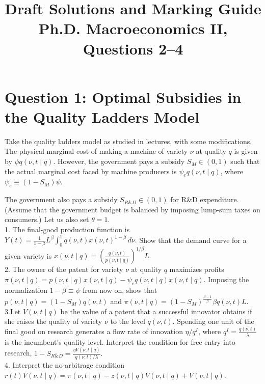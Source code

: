 \documentclass[11pt]{article}
\title{Draft Solutions and Marking Guide\\
Ph.D. Macroeconomics II, Questions 2--4}
\author{}
\date{}
\begin{document}
\maketitle

\section{Question 1: Optimal Subsidies in the Quality Ladders Model}

Take the quality ladders model as studied in lectures, with some modifications. The physical marginal cost of making a machine of variety $\nu$ at quality $q$ is given by $\psi q(\nu,t \mid q)$. However, the government pays a subsidy $S_M \in (0,1)$ such that the actual marginal cost faced by machine producers is $\psi_e q(\nu,t \mid q)$, where $\psi_e \equiv (1-S_M)\psi.$

The government also pays a subsidy $S_{R\&D} \in (0,1)$ for R\&D expenditure. (Assume that the government budget is balanced by imposing lump-sum taxes on consumers.) Let us also set $\theta = 1$.\\

1. The final-good production function is $Y(t)=\frac{1}{1-\beta}L^\beta \int_0^1 q(\nu,t)x(\nu,t)^{1-\beta}\, d\nu .$ Show that the demand curve for a given variety is $x(\nu,t \mid q)=\left(\frac{q(\nu,t)}{p(\nu,t \mid q)}\right)^{1/\beta}L.$\\

2. The owner of the patent for variety $\nu$ at quality $q$ maximizes profits $\pi(\nu,t \mid q)=p(\nu,t \mid q)x(\nu,t \mid q)-\psi_e q(\nu,t \mid q)x(\nu,t \mid q).$ Imposing the normalization $1-\beta \equiv \psi$ from now on, show that $p(\nu,t \mid q)=(1-S_M)q(\nu,t)$ and $\pi(\nu,t \mid q)=(1-S_M)^{\frac{\beta-1}{\beta}}\beta q(\nu,t)L.$\\


3.Let $V(\nu,t \mid q)$ be the value of a patent that a successful innovator obtains if she raises the quality of variety $\nu$ to the level $q(\nu,t)$. Spending one unit of the final good on research generates a flow rate of innovation $\eta/q^I$, where $q^I=\frac{q(\nu,t)}{\lambda}$ is the incumbent's quality level. Interpret the condition for free entry into research, $1-S_{R\&D}=\frac{\eta V(\nu,t \mid q)}{q(\nu,t)/\lambda}.$\\

4. Interpret the no-arbitrage condition $r(t)V(\nu,t \mid q)=\pi(\nu,t \mid q)-z(\nu,t \mid q)V(\nu,t \mid q)+\dot V(\nu,t \mid q).$\\
\end{document}
